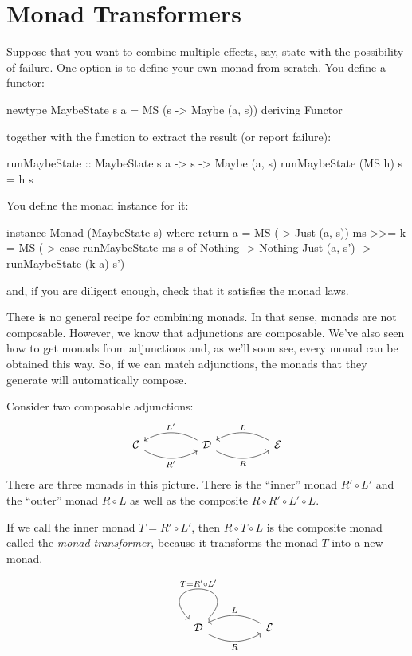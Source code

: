 \documentclass[DaoFP]{subfiles}
\begin{document}
\section{Monad Transformers}

Suppose that you want to combine multiple effects, say, state with the possibility of failure. One option is to define your own monad from scratch. You define a functor:
\begin{haskell}
newtype MaybeState s a = MS (s -> Maybe (a, s))
  deriving Functor
\end{haskell}
together with the function to extract the result (or report failure):
\begin{haskell}
runMaybeState :: MaybeState s a -> s -> Maybe (a, s)
runMaybeState (MS h) s = h s
\end{haskell}
You define the monad instance for it:
\begin{haskell}
instance Monad (MaybeState s) where
  return a = MS (\s -> Just (a, s))
  ms >>= k = MS (\s -> case runMaybeState ms s of
                       Nothing -> Nothing
                       Just (a, s') -> runMaybeState (k a) s')
\end{haskell}
and, if you are diligent enough, check that it satisfies the monad laws.

There is no general recipe for combining monads. In that sense, monads are not composable. However, we know that adjunctions are composable. We've also seen how to get monads from adjunctions and, as we'll soon see, every monad can be obtained this way. So, if we can match adjunctions, the monads that they generate will automatically compose.

Consider two composable adjunctions:
\[
 \begin{tikzcd}
  \mathcal{C}
  \arrow[rr, bend right, "R'"']
  &&
  \mathcal{D}
  \arrow[ll, bend right, "L'"']
    \arrow[rr, bend right, "R"']
&&
  \mathcal{E}
  \arrow[ll, bend right, "L"']
 \end{tikzcd}
\]
There are three monads in this picture. There is the ``inner'' monad $R' \circ L'$ and the ``outer'' monad $R \circ L$ as well as the composite $R \circ R' \circ L' \circ L$. 

If we call the inner monad $T = R' \circ L'$, then $R \circ T \circ L$ is the composite monad called the \emph{monad transformer}, because it transforms the monad $T$ into a new monad. 

\[
 \begin{tikzcd}
   &&
  \mathcal{D}
  \arrow[loop, "T = R' \circ L'"']
    \arrow[rr, bend right, "R"']
&&
  \mathcal{E}
  \arrow[ll, bend right, "L"']
 \end{tikzcd}
\]
\end{document}
